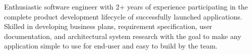 

\begin{cvparagraph}

Enthusiastic software engineer with 2+ years of experience participating in the complete product development lifecycle of successfully launched applications. Skilled in developing business plans, requirement specification, user documentation, and architectural system research with the goal to make any application simple to use for end-user and easy to build by the team.
\end{cvparagraph}
